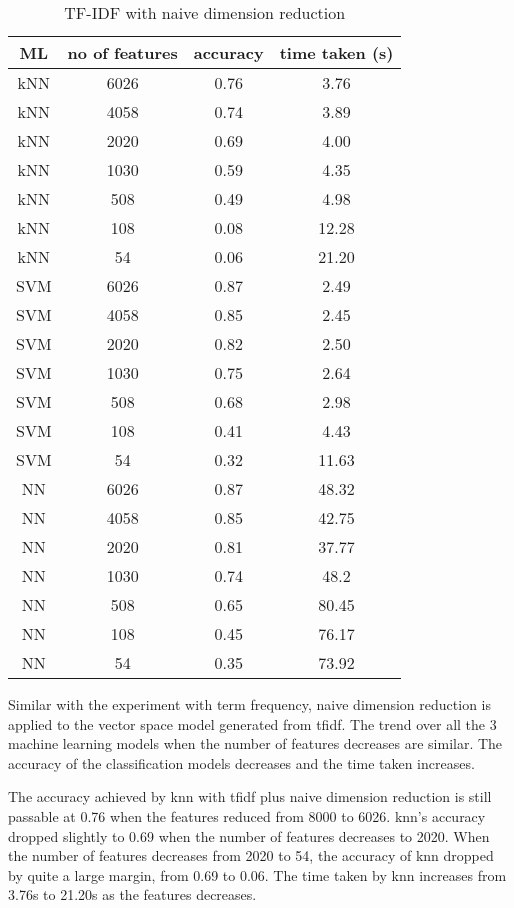 \begin{table} [ht]
	\centering
	\caption{TF-IDF with naive dimension reduction}
	\label{tbl:tfidfNaive}
	\begin{tabular}{|| c | c | c | c||}
		\hline
		ML & no of features & accuracy & time taken (s) \\ [0.5ex]
		\hline\hline
		kNN & 6026 & 0.76 & 3.76 \\ 
		\hline
		kNN & 4058 & 0.74 & 3.89 \\ 
		\hline
		kNN & 2020 & 0.69 & 4.00 \\ 
		\hline
		kNN & 1030 & 0.59 & 4.35 \\ 
		\hline
		kNN & 508 & 0.49 & 4.98 \\ 
		\hline
		kNN & 108 & 0.08 & 12.28 \\ 
		\hline
		kNN & 54 & 0.06 & 21.20 \\ 
		\hline\hline
		SVM & 6026 & 0.87 & 2.49 \\
		\hline
		SVM & 4058 & 0.85 & 2.45 \\
		\hline
		SVM & 2020 & 0.82 & 2.50 \\
		\hline
		SVM & 1030 & 0.75 & 2.64 \\
		\hline
		SVM & 508 & 0.68 & 2.98 \\
		\hline
		SVM & 108 & 0.41 & 4.43 \\
		\hline
		SVM & 54 & 0.32 & 11.63 \\
		\hline\hline
		NN & 6026 & 0.87 & 48.32 \\
		\hline
		NN & 4058 & 0.85 & 42.75 \\
		\hline
		NN & 2020 & 0.81 & 37.77 \\
		\hline
		NN & 1030 & 0.74 & 48.2 \\
		\hline
		NN & 508 & 0.65 & 80.45 \\
		\hline
		NN & 108 & 0.45 & 76.17 \\
		\hline
		NN & 54 & 0.35 & 73.92 \\
		\hline
	\end{tabular}
\end{table}

Similar with the experiment with term frequency, naive dimension reduction is applied to the vector space model generated from \ac{tfidf}. The trend over all the 3 machine learning models when the number of features decreases are similar. The accuracy of the classification models decreases and the time taken increases. 

The accuracy achieved by \ac{knn} with \ac{tfidf} plus naive dimension reduction is still passable at 0.76 when the features reduced from 8000 to 6026. \Ac{knn}'s accuracy dropped slightly to 0.69 when the number of features decreases to 2020. When the number of features decreases from 2020 to 54, the accuracy of \ac{knn} dropped by quite a large margin, from 0.69 to 0.06. The time taken by \ac{knn} increases from 3.76s to 21.20s as the features decreases.

